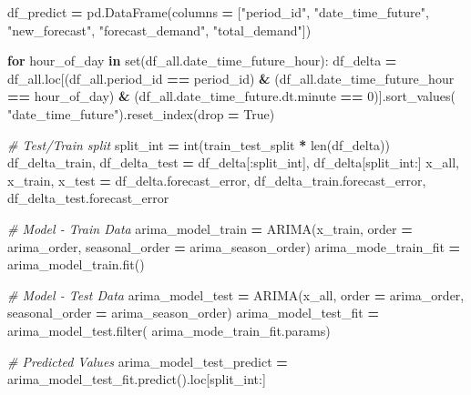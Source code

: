 \documentclass[mstat,12pt]{unswthesis}
\newenvironment{Shaded}{\begin{snugshade}}{\end{snugshade}}
\newcommand{\BuiltInTok}[1]{#1}
\newcommand{\CommentTok}[1]{\textcolor[rgb]{0.56,0.35,0.01}{\textit{#1}}}
\newcommand{\ControlFlowTok}[1]{\textcolor[rgb]{0.13,0.29,0.53}{\textbf{#1}}}
\newcommand{\DecValTok}[1]{\textcolor[rgb]{0.00,0.00,0.81}{#1}}
\newcommand{\KeywordTok}[1]{\textcolor[rgb]{0.13,0.29,0.53}{\textbf{#1}}}
\newcommand{\NormalTok}[1]{#1}
\newcommand{\OperatorTok}[1]{\textcolor[rgb]{0.81,0.36,0.00}{\textbf{#1}}}
\newcommand{\StringTok}[1]{\textcolor[rgb]{0.31,0.60,0.02}{#1}}
\newcommand{\VariableTok}[1]{\textcolor[rgb]{0.00,0.00,0.00}{#1}}
\begin{document}
\begin{Shaded}
\begin{Highlighting}[]
\NormalTok{df\_predict }\OperatorTok{=}\NormalTok{ pd.DataFrame(columns }\OperatorTok{=}\NormalTok{ [}\StringTok{"period\_id"}\NormalTok{, }\StringTok{"date\_time\_future"}\NormalTok{, }
    \StringTok{"new\_forecast"}\NormalTok{, }\StringTok{"forecast\_demand"}\NormalTok{, }\StringTok{"total\_demand"}\NormalTok{])}

\ControlFlowTok{for}\NormalTok{ hour\_of\_day }\KeywordTok{in} \BuiltInTok{set}\NormalTok{(df\_all.date\_time\_future\_hour):}
\NormalTok{    df\_delta }\OperatorTok{=}\NormalTok{ df\_all.loc[(df\_all.period\_id }\OperatorTok{==}\NormalTok{ period\_id) }\OperatorTok{\&} 
\NormalTok{        (df\_all.date\_time\_future\_hour }\OperatorTok{==}\NormalTok{ hour\_of\_day) }\OperatorTok{\&} 
\NormalTok{        (df\_all.date\_time\_future.dt.minute }\OperatorTok{==} \DecValTok{0}\NormalTok{)].sort\_values(}
            \StringTok{"date\_time\_future"}\NormalTok{).reset\_index(drop }\OperatorTok{=} \VariableTok{True}\NormalTok{)}

    \CommentTok{\# Test/Train split}
\NormalTok{    split\_int }\OperatorTok{=} \BuiltInTok{int}\NormalTok{(train\_test\_split }\OperatorTok{*} \BuiltInTok{len}\NormalTok{(df\_delta))}
\NormalTok{    df\_delta\_train, df\_delta\_test }\OperatorTok{=} 
\NormalTok{        df\_delta[:split\_int], df\_delta[split\_int:]}
\NormalTok{    x\_all, x\_train, x\_test }\OperatorTok{=}\NormalTok{ df\_delta.forecast\_error, }
\NormalTok{        df\_delta\_train.forecast\_error, df\_delta\_test.forecast\_error}

    \CommentTok{\# Model {-} Train Data}
\NormalTok{    arima\_model\_train }\OperatorTok{=}\NormalTok{ ARIMA(x\_train, order }\OperatorTok{=}\NormalTok{ arima\_order, }
\NormalTok{        seasonal\_order }\OperatorTok{=}\NormalTok{ arima\_season\_order)}
\NormalTok{    arima\_mode\_train\_fit }\OperatorTok{=}\NormalTok{ arima\_model\_train.fit()}

    \CommentTok{\# Model {-} Test Data}
\NormalTok{    arima\_model\_test }\OperatorTok{=}\NormalTok{ ARIMA(x\_all, order }\OperatorTok{=}\NormalTok{ arima\_order, }
\NormalTok{        seasonal\_order }\OperatorTok{=}\NormalTok{ arima\_season\_order)}
\NormalTok{    arima\_model\_test\_fit }\OperatorTok{=}\NormalTok{ arima\_model\_test.}\BuiltInTok{filter}\NormalTok{(}
\NormalTok{        arima\_mode\_train\_fit.params)}

    \CommentTok{\# Predicted Values}
\NormalTok{    arima\_model\_test\_predict }\OperatorTok{=} 
\NormalTok{        arima\_model\_test\_fit.predict().loc[split\_int:]}


\end{Highlighting}
\end{Shaded}
\end{document}
